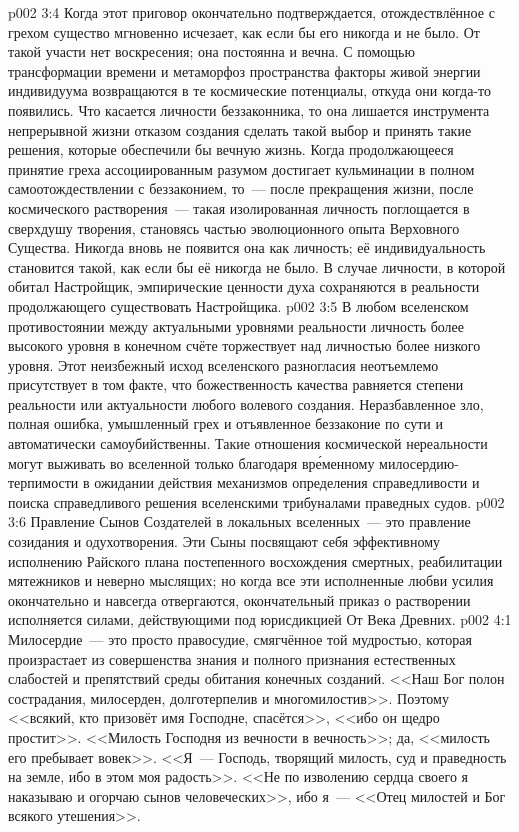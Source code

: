 \vs p002 3:4 Когда этот приговор окончательно подтверждается, отождествлённое с грехом существо мгновенно исчезает, как если бы его никогда и не было. От такой участи нет воскресения; она постоянна и вечна. С помощью трансформации времени и метаморфоз пространства факторы живой энергии индивидуума возвращаются в те космические потенциалы, откуда они когда\hyp{}то появились. Что касается личности беззаконника, то она лишается инструмента непрерывной жизни отказом создания сделать такой выбор и принять такие решения, которые обеспечили бы вечную жизнь. Когда продолжающееся принятие греха ассоциированным разумом достигает кульминации в полном самоотождествлении с беззаконием, то~--- после прекращения жизни, после космического растворения~--- такая изолированная личность поглощается в сверхдушу творения, становясь частью эволюционного опыта Верховного Существа. Никогда вновь не появится она как личность; её индивидуальность становится такой, как если бы её никогда не было. В случае личности, в которой обитал Настройщик, эмпирические ценности духа сохраняются в реальности продолжающего существовать Настройщика.
\vs p002 3:5 \pc В любом вселенском противостоянии между актуальными уровнями реальности личность более высокого уровня в конечном счёте торжествует над личностью более низкого уровня. Этот неизбежный исход вселенского разногласия неотъемлемо присутствует в том факте, что божественность качества равняется степени реальности или актуальности любого волевого создания. Неразбавленное зло, полная ошибка, умышленный грех и отъявленное беззаконие по сути и автоматически самоубийственны. Такие отношения космической нереальности могут выживать во вселенной только благодаря вр\'еменному милосердию\hyp{}терпимости в ожидании действия механизмов определения справедливости и поиска справедливого решения вселенскими трибуналами праведных судов.
\vs p002 3:6 Правление Сынов Создателей в локальных вселенных~--- это правление созидания и одухотворения. Эти Сыны посвящают себя эффективному исполнению Райского плана постепенного восхождения смертных, реабилитации мятежников и неверно мыслящих; но когда все эти исполненные любви усилия окончательно и навсегда отвергаются, окончательный приказ о растворении исполняется силами, действующими под юрисдикцией От Века Древних.
\vs p002 4:1 Милосердие~--- это просто правосудие, смягчённое той мудростью, которая произрастает из совершенства знания и полного признания естественных слабостей и препятствий среды обитания конечных созданий. <<Наш Бог полон сострадания, милосерден, долготерпелив и многомилостив>>. Поэтому <<всякий, кто призовёт имя Господне, спасётся>>, <<ибо он щедро простит>>. <<Милость Господня из вечности в вечность>>; да, <<милость его пребывает вовек>>. <<Я~--- Господь, творящий милость, суд и праведность на земле, ибо в этом моя радость>>. <<Не по изволению сердца своего я наказываю и огорчаю сынов человеческих>>, ибо я~--- <<Отец милостей и Бог всякого утешения>>.
